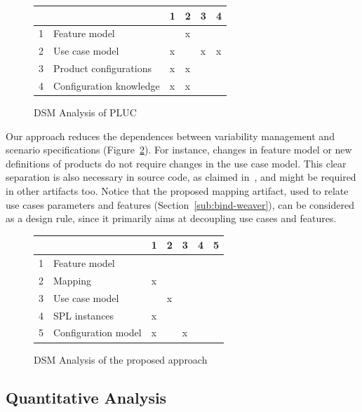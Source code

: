 \documentclass{acm_proc_article-sp}
\begin{document}
\begin{figure}[htb]
\centering
\begin{small}
\begin{tabular}{llllll} \hline
&  & 1 & 2 & 3 & 4 \\ \hline
1 & Feature model 			& 	& x	& 	&   	\\ 
2 & Use case model 		& x 	&  	&  x	&  x  \\ 
3 & Product configurations	& x 	& x	& 	&    	\\
4 & Configuration knowledge 	& x 	& x 	& 	&    	\\ \hline
\end{tabular}
\end{small}
\caption{DSM Analysis of PLUC}
\label{dsm:pluc}
\end{figure}

Our approach reduces the dependences between variability management and scenario specifications 
(Figure~\ref{dsm:cc}). For instance, changes in feature model or new definitions of products do not require changes in the use case model. This clear separation is also necessary in source code, as claimed in~\cite{alves-gpce-06, apel-icse2006}, and might be required in other artifacts too. Notice that the proposed mapping artifact, used to relate use cases parameters and features (Section~\ref{sub:bind-weaver}), can be considered as a design rule, since it primarily aims at decoupling use cases and features.  

\begin{figure}[h]
\centering
\begin{small}
\begin{tabular}{lllllll} \hline
& & 1 & 2 & 3 & 4 & 5 \\ \hline
1 & Feature model 		& 	& 	&      &  	&  	\\ 
2 & Mapping	 		& x	&	&	&	&  	\\
3 & Use case model 	&  	&  x	&  	&  	& 	\\
4 & SPL instances 		& x 	& 	& 	&   	& 	\\
5 & Configuration model 	& x 	&  	&  x	&  	& 	\\  \hline
\end{tabular}
\end{small}
\caption{DSM Analysis of the proposed approach}
\label{dsm:cc}
\end{figure}   

\subsection{Quantitative Analysis}
\end{document}
